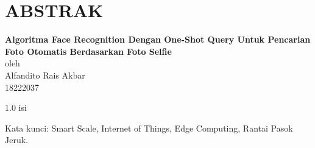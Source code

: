 \chapter*{ABSTRAK}

\begin{center}

    \textbf{Algoritma Face Recognition Dengan One-Shot Query Untuk Pencarian Foto Otomatis Berdasarkan Foto Selfie} \\
    \vspace{0.4cm}
    oleh \\
    \vspace{0.4cm}
    Alfandito Rais Akbar\\
    18222037\\
\end{center}


\begin{spacing}{1.0}
isi

Kata kunci: Smart Scale, Internet of Things, Edge Computing, Rantai Pasok Jeruk.
\end{spacing}

